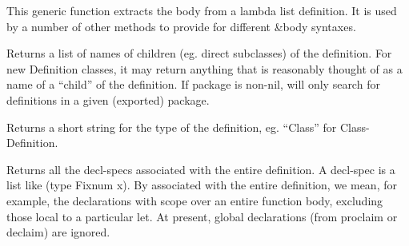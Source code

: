 \endDefinition


\beginDefinition


\beginDocumentation
This generic function extracts the body from a
  lambda list definition.  It is used by a number of other methods to
  provide for different \&body syntaxes.\endDocumentation
{}\endUsage
\beginArguments
{}\endArg
\endArguments
\beginReturn
\singleReturn {}\endcReturn
\endReturn

\endDefinition


\beginDefinition


\beginDocumentation
Returns a list of names of children (eg. direct
subclasses) of the definition.  For new Definition classes, it may
return anything that is reasonably thought of as a name of a ``child''
of the definition.  
  If package is non-nil, will only search for definitions in a given
(exported) package.\endDocumentation
{}\endUsage
\beginArguments
{}\endArg
{}\endArg
\endArguments
\beginReturn
\singleReturn {}\endtReturn
\endReturn

\endDefinition


\beginDefinition


\beginDocumentation
Returns a short string for the type of the definition,
eg. ``Class'' for \<Class-Definition\>.\endDocumentation
{}\endUsage
\beginArguments
{}\endArg
\endArguments
\beginReturn
\singleReturn {}\endtReturn
\endReturn

\endDefinition


\beginDefinition


\beginDocumentation
Returns all the decl-specs associated with the entire definition.
A decl-spec is a list like (type Fixnum x).  By associated with the
entire definition, we mean, for example, the declarations with scope
over an entire function body, excluding those local to a particular
\<let\>. At present, global declarations (from \<proclaim\> or \<declaim\>)
are ignored.\endDocumentation
{}\endUsage
\beginArguments
{}\endArg
\endArguments
\beginReturn
\singleReturn {}\endtReturn
\endReturn

